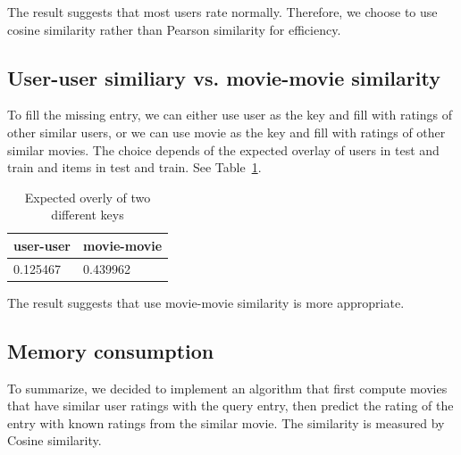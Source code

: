 The result suggests that most users rate normally. Therefore, we
choose to use cosine similarity rather than Pearson similarity for
efficiency.

\subsection*{User-user similiary vs. movie-movie similarity}
To fill the missing entry, we can either use user as the key and fill with
ratings of other similar users, or we can use movie as the key and
fill with ratings of other similar movies. The choice depends of the
expected overlay of users in test and train and items in test and
train. See Table~\ref{tab:overlay}.

\begin{table}[!ht]
  \centering
  \begin{tabular}{|p{5cm}|p{5cm}|}
    \hline
    user-user & movie-movie\\
    \hline
    0.125467 & 0.439962\\
    \hline
  \end{tabular}
  \caption{Expected overly of two different keys}
  \label{tab:overlay}
\end{table}

The result suggests that use movie-movie similarity is more
appropriate.

\subsection*{Memory consumption}


To summarize, we decided to implement an algorithm that first compute
movies that have similar user ratings with the query entry, then
predict the rating of the entry with known ratings from the similar
movie. The similarity is measured by Cosine similarity.
